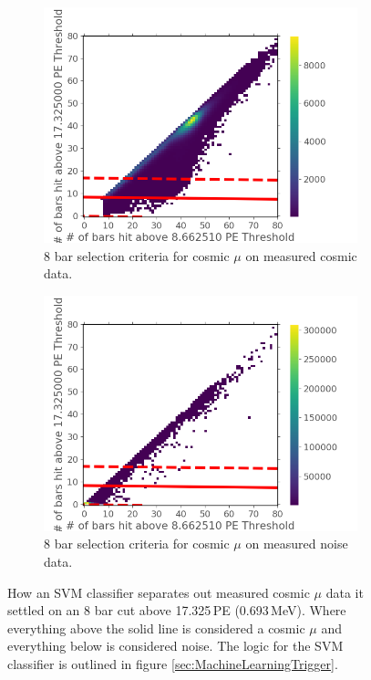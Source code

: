 \begin{figure}[!h]
\centering
\begin{subfigure}{.5\textwidth}
  \centering
  \includegraphics[width=\linewidth]{Chapter5/Figs/Raster/Cosmic8BarSignalCutSVM.png}
  \captionsetup{width=.9\linewidth}
  \caption{8 bar selection criteria for cosmic $\mu$ on measured cosmic data.}
  \label{subFig:cosmic8BarSignalCutSVM}
\end{subfigure}%
\begin{subfigure}{.5\textwidth}
  \centering
\includegraphics[width=\linewidth]{Chapter5/Figs/Raster/Cosmic8BarNoiseCutSVM.png}
  \captionsetup{width=.9\linewidth}
  \caption{8 bar selection criteria for cosmic $\mu$ on measured noise data.}
  \label{subFig:cosmic8BarNoiseCutSVM}
\end{subfigure}
\caption{How an SVM classifier separates out measured cosmic $\mu$ data it settled on an 8 bar cut above 17.325\,PE (0.693\,MeV). Where everything above the solid line is considered a cosmic $\mu$ and everything below is considered noise. The logic for the SVM classifier is outlined in figure \ref{sec:MachineLearningTrigger}.}
\label{fig:cosmic8BarSignalNoiseCutSVM}
\end{figure}

